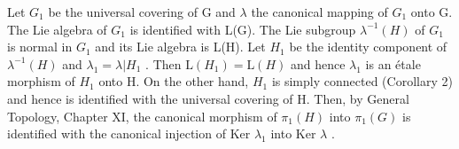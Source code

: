 Let \(G_{1}\) be the universal covering of G and \(\lambda\) the canonical mapping of \(G_{1}\) onto G. The Lie algebra of \(G_{1}\) is identified with L(G). The Lie subgroup \(\lambda^{-1}(H)\) of \(G_{1}\) is normal in \(G_{1}\) and its Lie algebra is L(H). Let \(H_{1}\) be the identity component of \(\lambda^{-1}(H)\) and \(\lambda_{1} = \lambda | H_{1}\) . Then \(\mathrm{L}(H_{1}) = \mathrm{L}(H)\) and hence \(\lambda_{1}\) is an étale morphism of \(H_{1}\) onto H. On the other hand, \(H_{1}\) is simply connected (Corollary 2) and hence is identified with the universal covering of H. Then, by General Topology, Chapter XI, the canonical morphism of \(\pi_{1}(H)\) into \(\pi_{1}(G)\) is identified with the canonical injection of Ker \(\lambda_{1}\) into Ker \(\lambda\) .

